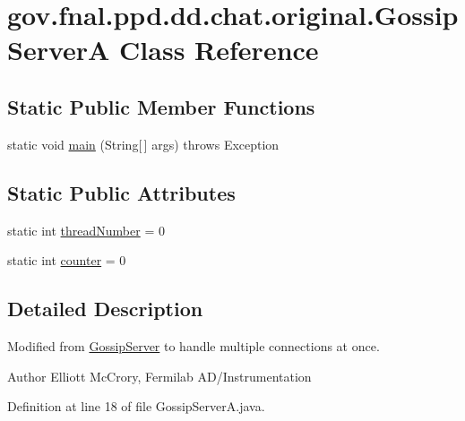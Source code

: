 \hypertarget{classgov_1_1fnal_1_1ppd_1_1dd_1_1chat_1_1original_1_1GossipServerA}{\section{gov.\-fnal.\-ppd.\-dd.\-chat.\-original.\-Gossip\-Server\-A Class Reference}
\label{classgov_1_1fnal_1_1ppd_1_1dd_1_1chat_1_1original_1_1GossipServerA}
}
\subsection*{Static Public Member Functions}
\begin{DoxyCompactItemize}
\item 
static void \hyperlink{classgov_1_1fnal_1_1ppd_1_1dd_1_1chat_1_1original_1_1GossipServerA_a46abdc4798bd0f2cefa9085bdebd0229}{main} (String\mbox{[}$\,$\mbox{]} args)  throws Exception 
\end{DoxyCompactItemize}
\subsection*{Static Public Attributes}
\begin{DoxyCompactItemize}
\item 
static int \hyperlink{classgov_1_1fnal_1_1ppd_1_1dd_1_1chat_1_1original_1_1GossipServerA_a4a676478d98fd09ff72e452da6eefc7f}{thread\-Number} = 0
\item 
static int \hyperlink{classgov_1_1fnal_1_1ppd_1_1dd_1_1chat_1_1original_1_1GossipServerA_a7028f4794e09c2b9fbf294ef563ac64e}{counter} = 0
\end{DoxyCompactItemize}


\subsection{Detailed Description}
Modified from \hyperlink{classgov_1_1fnal_1_1ppd_1_1dd_1_1chat_1_1original_1_1GossipServer}{Gossip\-Server} to handle multiple connections at once.

\begin{DoxyAuthor}{Author}
Elliott Mc\-Crory, Fermilab A\-D/\-Instrumentation 
\end{DoxyAuthor}


Definition at line 18 of file Gossip\-Server\-A.\-java.




